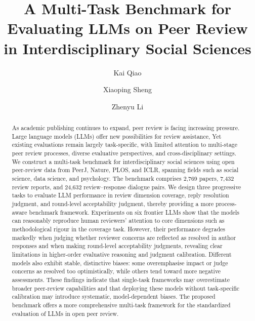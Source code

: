\documentclass[preprint,10pt,times]{elsarticle}
\begin{document}
\linenumbers

\begin{frontmatter}

\title{A Multi-Task Benchmark for Evaluating LLMs on Peer Review in Interdisciplinary Social Sciences}

\author[a]{Kai Qiao }
\author[a,b]{Xiaoping Sheng }
\author[a]{Zhenyu Li }



\begin{abstract}
As academic publishing continues to expand, peer review is facing increasing pressure. Large language models (LLMs) offer new possibilities for review assistance, Yet existing evaluations remain largely task-specific, with limited attention to multi-stage peer review processes, diverse evaluative perspectives, and cross-disciplinary settings. We construct a multi-task benchmark for interdisciplinary social sciences using open peer-review data from PeerJ, Nature, PLOS, and ICLR, spanning fields such as social science, data science, and psychology. The benchmark comprises 2,769 papers, 7,432 review reports, and 24,632 review--response dialogue pairs. We design three progressive tasks to evaluate LLM performance in review dimension coverage, reply resolution judgment, and round-level acceptability judgment, thereby providing a more process-aware benchmark framework. Experiments on six frontier LLMs show that the models can reasonably reproduce human reviewers' attention to core dimensions such as methodological rigour in the coverage task. However, their performance degrades markedly when judging whether reviewer concerns are reflected as resolved in author responses and when making round-level acceptability judgments, revealing clear limitations in higher-order evaluative reasoning and judgment calibration. Different models also exhibit stable, distinctive biases: some overemphasise impact or judge concerns as resolved too optimistically, while others tend toward more negative assessments. These findings indicate that single-task frameworks may overestimate broader peer-review capabilities and that deploying these models without task-specific calibration may introduce systematic, model-dependent biases. The proposed benchmark offers a more comprehensive multi-task framework for the standardized evaluation of LLMs in open peer review.
\end{abstract}


\end{frontmatter}
\end{document}
